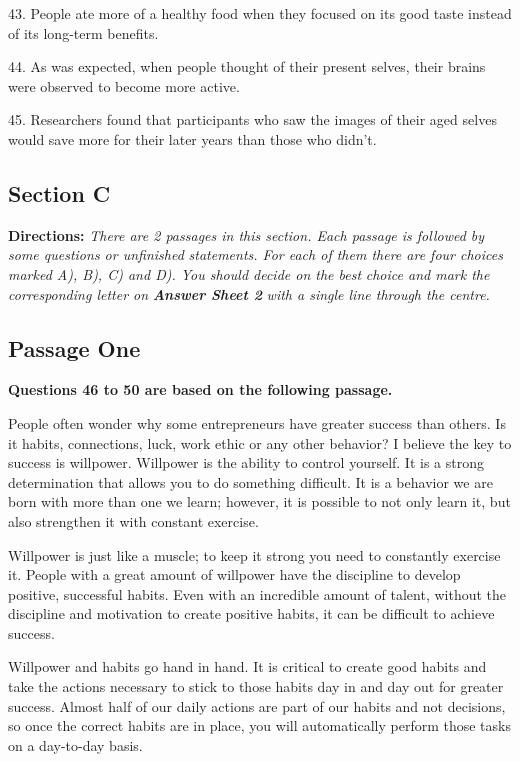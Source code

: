 \documentclass[UTF8,11pt]{ctexart}
\begin{document}
43. People ate more of a healthy food when they focused on its good taste instead of its long-term benefits.


44. As was expected, when people thought of their present selves, their brains were observed to become more active.


45. Researchers found that participants who saw the images of their aged selves would save more for their later years than those who didn’t.


\subsection*{\textbf{Section C}}


\textbf{Directions: }\textit{There are 2 passages in this section. Each passage is followed by some questions or unfinished} \textit{statements. For each of them there are four choices marked A), B), C) and D). You should decide on the best} \textit{choice and mark the corresponding letter on }\textbf{\textit{Answer Sheet 2}}\textit{ with a single line through the centre.}


\subsection*{\textbf{Passage One}}


\textbf{Questions 46 to 50 are based on the following passage.}


People often wonder why some entrepreneurs have greater success than others. Is it habits, connections, luck, work ethic or any other behavior? I believe the key to success is willpower. Willpower is the ability to control yourself. It is a strong determination that allows you to do something difficult. It is a behavior we are born with more than one we learn; however, it is possible to not only learn it, but also strengthen it with constant exercise.


Willpower is just like a muscle; to keep it strong you need to constantly exercise it. People with a great amount of willpower have the discipline to develop positive, successful habits. Even with an incredible amount of talent, without the discipline and motivation to create positive habits, it can be difficult to achieve success.


Willpower and habits go hand in hand. It is critical to create good habits and take the actions necessary to stick to those habits day in and day out for greater success. Almost half of our daily actions are part of our habits and not decisions, so once the correct habits are in place, you will automatically perform those tasks on a day-to-day basis.
\end{document}

